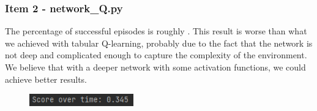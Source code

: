 \documentclass{assignmeownt}
\begin{document}
\subsubsection{Item 2 - network\_Q.py}
The percentage of successful episodes is roughly .
This result is worse than what we achieved with tabular Q-learning, probably due to the fact that the network is not
deep and complicated enough to capture the complexity of the environment. We believe that with a deeper network with
some activation functions, we could achieve better results.

\begin{figure}[H]
\centering
\includegraphics[width=0.4\textwidth]{score_ex2_item2.png}
\end{figure}
\end{document}
